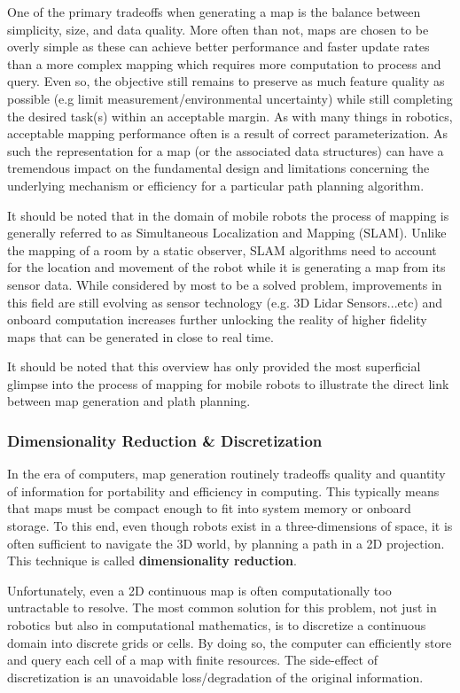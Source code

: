 One of the primary tradeoffs when generating a map is the balance between simplicity, size, and data quality. More often than not, maps are chosen to be overly simple as these can achieve better performance and faster update rates than a more complex mapping which requires more computation to process and query. Even so, the objective still remains to preserve as much feature quality as possible (e.g limit measurement/environmental uncertainty) while still completing the desired task(s) within an acceptable margin. As with many things in robotics, acceptable mapping performance often is a result of correct parameterization. As such the representation for a map (or the associated data structures) can have a tremendous impact on the fundamental design and limitations concerning the underlying mechanism or efficiency for a particular path planning algorithm.

It should be noted that in the domain of mobile robots the process of mapping is generally referred to as Simultaneous Localization and Mapping (SLAM). Unlike the mapping of a room by a static observer, SLAM algorithms need to account for the location and movement of the robot while it is generating a map from its sensor data. While considered by most to be a solved problem, improvements in this field are still evolving as sensor technology (e.g. 3D Lidar Sensors...etc) and onboard computation increases further unlocking the reality of higher fidelity maps that can be generated in close to real time. 


 It should be noted that this overview has only provided the most superficial glimpse into the process of mapping for mobile robots to illustrate the direct link between map generation and plath planning. 


\subsubsection{Dimensionality Reduction \& Discretization}

In the era of computers, map generation routinely tradeoffs quality and quantity of information for portability and efficiency in computing. This typically means that maps must be compact enough to fit into system memory or onboard storage. To this end, even though robots exist in a three-dimensions of space, it is often sufficient to navigate the 3D world, by planning a path in a 2D projection. This technique is called \textbf{dimensionality reduction}. 

Unfortunately, even a 2D continuous map is often computationally too untractable to resolve. The most common solution for this problem, not just in robotics but also in computational mathematics, is to discretize a continuous domain into discrete grids or cells. By doing so, the computer can efficiently store and query each cell of a map with finite resources. The side-effect of discretization is an unavoidable loss/degradation of the original information.


